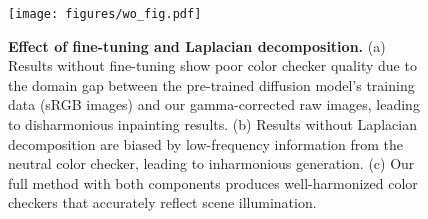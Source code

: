 \begin{figure}[t]
    \centering
    \vspace{-2mm}
    \texttt{[image: figures/wo\_fig.pdf]}
    \vspace{-8mm}
    \caption{\textbf{Effect of fine-tuning and Laplacian decomposition.} 
    (a) Results without fine-tuning show poor color checker quality due to the domain gap between the pre-trained diffusion model's training data (sRGB images) and our gamma-corrected raw images, leading to disharmonious inpainting results. (b) Results without Laplacian decomposition are biased by low-frequency information from the neutral color checker, leading to inharmonious generation. (c) Our full method with both components produces well-harmonized color checkers that accurately reflect scene illumination.}
    \label{fig:wo_fig}
    \vspace{-1mm}
\end{figure}
